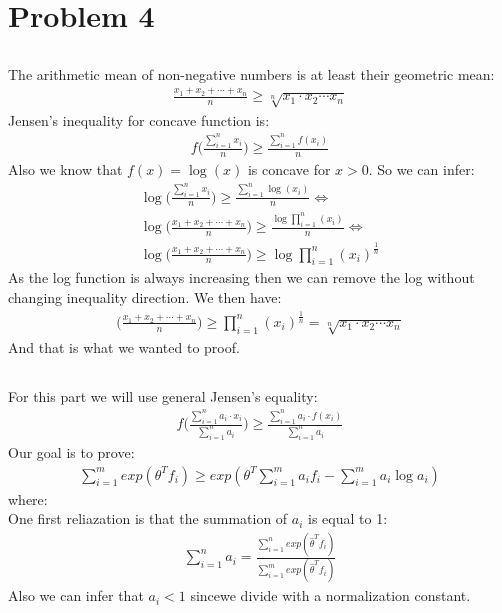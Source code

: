 \clearpage{}
\section{Problem 4}
\subsection{}
The arithmetic mean of non-negative numbers is at least their geometric mean:
\begin{align*}
\frac{x_1 + x_2 + \cdots + x_n}{n} \geq \sqrt[n]{x_1 \cdot  x_2  \cdots x_n}
\end{align*}
Jensen's inequality for concave function is:
\begin{align*}
f\bigg(\frac{\displaystyle\sum_{i=1}^{n}x_i}{n}\bigg) \geq \frac{\displaystyle\sum_{i=1}^{n}f(x_i)}{n}
\end{align*}
Also we know that $f(x) = \log(x)$ is concave for $x > 0$. So we can infer:
\begin{align*}
\log\bigg(\frac{\displaystyle\sum_{i=1}^{n}x_i}{n}\bigg) \geq \frac{\displaystyle\sum_{i=1}^{n}\log(x_i)}{n} \Leftrightarrow \\
\log\bigg(\frac{x_1 + x_2 + \cdots + x_n}{n}\bigg) \geq \frac{\log\displaystyle\prod_{i=1}^{n}(x_i)}{n} \Leftrightarrow \\
\log\bigg(\frac{x_1 + x_2 + \cdots + x_n}{n}\bigg) \geq \log\displaystyle\prod_{i=1}^{n}(x_i)^\frac{1}{n}
\end{align*}
As the log function is always increasing then we can remove the log without changing inequality direction.
We then have:
\begin{align*}
\bigg(\frac{x_1 + x_2 + \cdots + x_n}{n}\bigg) \geq \displaystyle\prod_{i=1}^{n}(x_i)^\frac{1}{n} = \sqrt[n]{x_1 \cdot  x_2  \cdots x_n}
\end{align*}
And that is what we wanted to proof.
\subsection{}
For this part we will use general Jensen's equality:
\begin{align*}
f\bigg(\frac{\displaystyle\sum_{i=1}^{n}a_i \cdot x_i}{\displaystyle\sum_{i=1}^{n}a_i}\bigg) \geq \frac{\displaystyle\sum_{i=1}^{n}a_i\cdot f(x_i)}{\displaystyle\sum_{i=1}^{n}a_i}
\end{align*}
Our goal is to prove:
\begin{align}\label{eq:one}
\displaystyle\sum_{i=1}^{m}exp(\theta^T f_i) \geq exp(\theta^T \displaystyle\sum_{i=1}^{m}a_i f_i - \displaystyle\sum_{i=1}^{m}a_i\log a_i)
\end{align}
where:\\
One first reliazation is that the summation of $a_i$ is equal to 1:
\begin{align*}
\displaystyle\sum_{i=1}^{n}a_i = \frac{\displaystyle\sum_{i=1}^{n}exp(\hat{\theta}^T f_i)}{\displaystyle\sum_{i=1}^{m}exp(\hat{\theta}^T f_i)}
\end{align*}
Also we can infer that $a_i < 1$ sincewe divide with a normalization constant.\\

